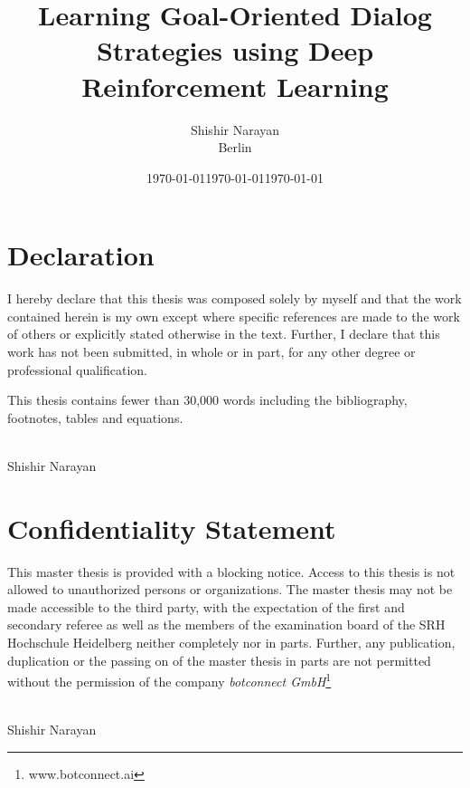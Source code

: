 \documentclass[14pt]{extarticle}
\numberwithin{equation}{section}
\begin{document}
	
	
	
	
	\title{Learning Goal-Oriented Dialog Strategies using Deep Reinforcement Learning}
	\author{Shishir Narayan \\ Berlin}
	\date{\today}
	
	
	
	\maketitle
	\clearpage
	
	\setcounter{page}{1}
	\section*{Declaration}
	I hereby declare that this thesis was composed solely by myself and that the work contained herein is my own except where specific references are made to the work of others or explicitly stated otherwise in the text. Further, I declare that this work has not been submitted, in whole or in part, for any other degree or professional qualification.
	
	This thesis contains fewer than 30,000 words including the bibliography, footnotes, tables and equations.
	\\\\
	\begin{flushright}
		Shishir Narayan\\
		\date{\today}
	\end{flushright}
	\clearpage
	\section*{Confidentiality Statement}
	This master thesis is provided with a blocking notice. Access to this thesis is not allowed to unauthorized persons or organizations. The master thesis may not be made accessible to the third party, with the expectation of the first and secondary referee as well as the members of the examination board of the SRH Hochschule Heidelberg neither completely nor in parts.
	Further, any publication, duplication or the passing on of the master thesis in parts are not permitted without the permission of the company \textit{botconnect GmbH}\footnote{www.botconnect.ai}
	\\\\
	\begin{flushright}
		Shishir Narayan\\
		\date{\today}
	\end{flushright}
	\clearpage
\end{document}
